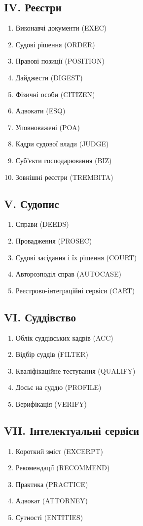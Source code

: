 \subsection{IV. Реєстри}
\begin{enumerate}
    \item Виконавчі документи (EXEC)
    \item Судові рішення (ORDER)
    \item Правові позиції (POSITION)
    \item Дайджести (DIGEST)
    \item Фізичні особи (CITIZEN)
    \item Адвокати (ESQ)
    \item Уповноважені (POA)
    \item Кадри судової влади (JUDGE)
    \item Суб'єкти господарювання (BIZ)
    \item Зовнішні реєстри (TREMBITA)
\end{enumerate}

\subsection{V. Судопис}
\begin{enumerate}
    \item Справи (DEEDS)
    \item Провадження (PROSEC)
    \item Судові засідання і їх рішення (COURT)
    \item Авторозподіл справ (AUTOCASE)
    \item Реєстрово-інтеграційні сервіси (CART)
\end{enumerate}

\subsection{VI. Суддівство}
\begin{enumerate}
    \item Облік суддівських кадрів (ACC)
    \item Відбір суддів (FILTER)
    \item Кваліфікаційне тестування (QUALIFY)
    \item Досьє на суддю (PROFILE)
    \item Верифікація (VERIFY)
\end{enumerate}

\subsection{VII. Інтелектуальні сервіси}
\begin{enumerate}
    \item Короткий зміст (EXCERPT)
    \item Рекомендації (RECOMMEND)
    \item Практика (PRACTICE)
    \item Адвокат (ATTORNEY)
    \item Сутності (ENTITIES)
\end{enumerate}

